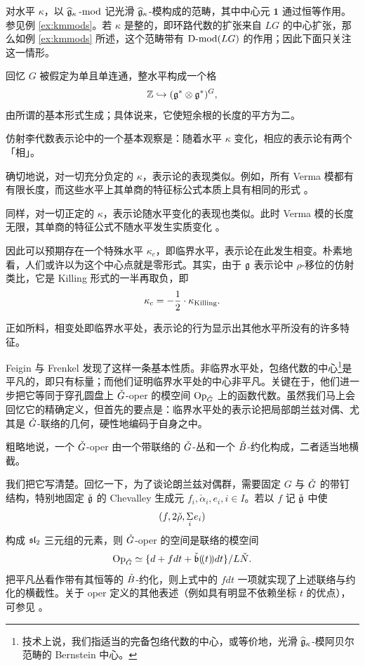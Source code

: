 \ssszh 对水平 $\kappa$，以 $\widehat{\mathfrak{g}}_\kappa\operatorname{-mod}$ 记光滑 $\widehat{\mathfrak{g}}_\kappa$-模构成的范畴，其中中心元 $\mathbf{1}$ 通过恒等作用。参见例 \ref{ex:kmmods}。若 $\kappa$ 是整的，即环路代数的扩张来自 $LG$ 的中心扩张，那么如例 \ref{ex:kmmods} 所述，这个范畴带有 $\operatorname{D-mod}(LG)$ 的作用；因此下面只关注这一情形。

回忆 $G$ 被假定为单且单连通，整水平构成一个格
\[ \mathbb{Z} \hookrightarrow (\mathfrak{g}^*
\otimes \mathfrak{g}^*)^G,\]
由所谓的基本形式生成；具体说来，它使短余根的长度的平方为二。

\ssszh 仿射李代数表示论中的一个基本观察是：随着水平 $\kappa$ 变化，相应的表示论有两个「相」。

确切地说，对一切充分负定的 $\kappa$，表示论的表现类似。例如，所有 Verma 模都有有限长度，而这些水平上其单商的特征标公式本质上具有相同的形式 \cite{kashiwaratanisakinegativeintegrallevel}。

同样，对一切正定的 $\kappa$，表示论随水平变化的表现也类似。此时 Verma 模的长度无限，其单商的特征公式不随水平发生实质变化 \cite{kashiwara90}。

因此可以预期存在一个特殊水平 $\kappa_c$，即临界水平，表示论在此发生相变。朴素地看，人们或许以为这个中心点就是零形式。其实，由于 $\mathfrak{g}$ 表示论中 $\rho$-移位的仿射类比，它是 Killing 形式的一半再取负，即
\[
\kappa_c = - \frac{1}{2} \cdot \kappa_{\operatorname{Killing}}.
\]

\ssszh 正如所料，相变处即临界水平处，表示论的行为显示出其他水平所没有的许多特征。

Feigin 与 Frenkel \cite{feiginfrenkel91} 发现了这样一条基本性质。非临界水平处，包络代数的中心\footnote{技术上说，我们指适当的完备包络代数的中心，或等价地，光滑 $\widehat{\mathfrak{g}}_\kappa$-模阿贝尔范畴的 Bernstein 中心。}是平凡的，即只有标量；而他们证明临界水平处的中心非平凡。关键在于，他们进一步把它等同于穿孔圆盘上 $\check{G}$-oper 的模空间 $\mathrm{Op}_{\check{G}}$ 上的函数代数。虽然我们马上会回忆它的精确定义，但首先的要点是：临界水平处的表示论把局部朗兰兹对偶、尤其是 $\check{G}$-联络的几何，硬性地编码于自身之中。

\ssszh 粗略地说，一个 $\check{G}$-oper 由一个带联络的 $\check{G}$-丛和一个 $\check{B}$-约化构成，二者适当地横截。

我们把它写清楚。回忆一下，为了谈论朗兰兹对偶群，需要固定 $G$ 与 $\check{G}$ 的带钉结构，特别地固定 $\check{\mathfrak{g}}$ 的 Chevalley 生成元 $f_i, \check{\alpha}_i, e_i, i \in I$。若以 $f$ 记 $\check{\mathfrak{g}}$ 中使
\[
(f, 2 \check{\rho}, \underset i \Sigma \hspace{.2mm} e_i )
\]
构成 $\mathfrak{sl}_2$ 三元组的元素，则 $\check{G}$-oper 的空间是联络的模空间
\begin{equation} \label{e:defopers}
\mathrm{Op}_{\check{G}} \simeq \{ d  + f dt + \check{\mathfrak{b}}(\!(t)\!)dt \} / L\check{N}.
\end{equation}
把平凡丛看作带有其恒等的 $\check{B}$-约化，则上式中的 $f dt$ 一项就实现了上述联络与约化的横截性。关于 oper 定义的其他表述（例如具有明显不依赖坐标 $t$ 的优点），可参见 \cite{BD}。

